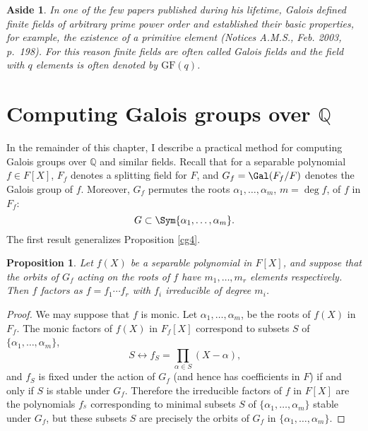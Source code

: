 \documentclass[a4paper,11pt,final,openany]{memoir}
\newtheorem{proposition}[X]{Proposition}
\newtheorem{aside}[X]{Aside}
\theoremstyle{nonumberplain}
\newtheorem{proof}{Proof.}
\begin{document}
\begin{aside}
\label{cg18a}In one of the few papers published during his lifetime, Galois
defined finite fields of arbitrary prime power order and established their
basic properties, for example, the existence of a primitive element (Notices
A.M.S., Feb. 2003, p.~198). For this reason finite fields are often called
\emph{Galois fields}%
and the field with $q$ elements is often denoted by $\mathrm{GF}(q)$.
\end{aside}

\section{Computing Galois groups over \texorpdfstring{$\mathbb{Q}$}{Q}}

In the remainder of this chapter, I describe a practical method for computing
Galois groups over $\mathbb{Q}$ and similar fields. Recall that for a
separable polynomial $f\in F[X]$, $F_{f}$ denotes a splitting field for $F$,
and $G_{f}=\Gal(F_{f}/F)$ denotes the Galois group of $f$. Moreover, $G_{f}$
permutes the roots $\alpha_{1},\ldots,\alpha_{m}$, $m=\deg f$, of $f$ in
$F_{f}$:%
\[
G\subset\Sym\{\alpha_{1},\ldots,\alpha_{m}\}\text{.}%
\]
The first result generalizes Proposition \ref{cg4}.

\begin{proposition}
\label{cg19}Let $f(X)$ be a separable polynomial in $F[X]$, and suppose that
the orbits of $G_{f}$ acting on the roots of $f$ have $m_{1},\ldots,m_{r}$
elements respectively. Then $f$ factors as $f=f_{1}\cdots f_{r}$ with $f_{i}$
irreducible of degree $m_{i}$.
\end{proposition}

\begin{proof}
We may suppose that $f$ is monic. Let $\alpha_{1},\ldots,\alpha_{m}$, be the
roots of $f(X)$ in $F_{f}$. The monic factors of $f(X)$ in $F_{f}[X]$
correspond to subsets $S$ of $\{\alpha_{1},\ldots,\alpha_{m}\}$,
\[
S\leftrightarrow f_{S}=\prod_{\alpha\in S}(X-\alpha)\text{,}%
\]
and $f_{S}$ is fixed under the action of $G_{f}$ (and hence has coefficients
in $F$) if and only if $S$ is stable under $G_{f}$. Therefore the irreducible
factors of $f$ in $F[X]$ are the polynomials $f_{^{S}}$ corresponding to
minimal subsets $S$ of $\{\alpha_{1},\ldots,\alpha_{m}\}$ stable under $G_{f}%
$, but these subsets $S$ are precisely the orbits of $G_{f}$ in $\{\alpha
_{1},\ldots,\alpha_{m}\}$.
\end{proof}
\end{document}
